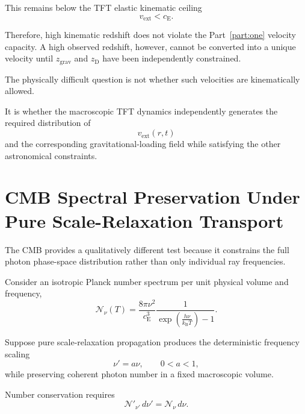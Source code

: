 This remains below the TFT elastic kinematic ceiling
\begin{equation}
    v_{\mathrm{ext}}
    <
    c_{\mathrm E}.
\end{equation}

Therefore, high kinematic redshift does not violate the Part~\ref{part:one} velocity
capacity. A high observed redshift, however, cannot be converted into a unique
velocity until \(z_{\mathrm{grav}}\) and \(z_{\mathrm D}\) have been
independently constrained.

The physically difficult question is not whether such velocities are
kinematically allowed.

It is whether the macroscopic TFT dynamics independently generates the
required distribution of
\begin{equation}
    v_{\mathrm{ext}}(r,t)
\end{equation}
and the corresponding gravitational-loading field while satisfying the other
astronomical constraints.


\section{CMB Spectral Preservation Under Pure Scale-Relaxation Transport}

The CMB provides a qualitatively different test because it constrains the full
photon phase-space distribution rather than only individual ray frequencies.

Consider an isotropic Planck number spectrum per unit physical volume and
frequency,
\begin{equation}
    \mathcal N_\nu(T)
    =
    \frac{
        8\pi\nu^2
    }{
        c_{\mathrm E}^{3}
    }
    \frac{1}{
        \exp
        \left(
            \frac{
                h\nu
            }{
                k_{\mathrm B}T
            }
        \right)
        -1
    }.
    \label{eq:AR_Planck_number}
\end{equation}

Suppose pure scale-relaxation propagation produces the deterministic frequency
scaling
\begin{equation}
    \nu'
    =
    a\nu,
    \qquad
    0<a<1,
    \label{eq:AR_CMB_a}
\end{equation}
while preserving coherent photon number in a fixed macroscopic volume.

Number conservation requires
\begin{equation}
    \mathcal N'_{\nu'}\,d\nu'
    =
    \mathcal N_\nu\,d\nu.
\end{equation}

